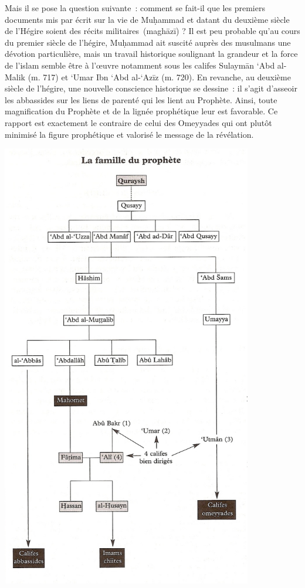 Mais il se pose la question suivante~: comment se fait-il que les
premiers documents mis par écrit sur la vie de Muḥammad et datant du
deuxième siècle de l'Hégire soient des récits militaires~(maghāzī) ? Il
est peu probable qu'au cours du premier siècle de l'hégire, Muḥammad ait
suscité auprès des musulmans une dévotion particulière, mais un travail
historique soulignant la grandeur et la force de l'islam semble être à
l'œuvre notamment sous les califes Sulaymān `Abd al-Malik (m. 717) et
`Umar Ibn `Abd al-`Azīz (m. 720). En revanche, au deuxième siècle de
l'hégire, une nouvelle conscience historique se dessine~: il s'agit
d'asseoir les abbassides sur les liens de parenté qui les lient au
Prophète. Ainsi, toute magnification du Prophète et de la lignée
prophétique leur est favorable. Ce rapport est exactement le contraire
de celui des Omeyyades qui ont plutôt minimisé la figure prophétique et
valorisé le message de la révélation.

\includegraphics[width=4.31134in,height=7.72685in]{Images/image039.png}

